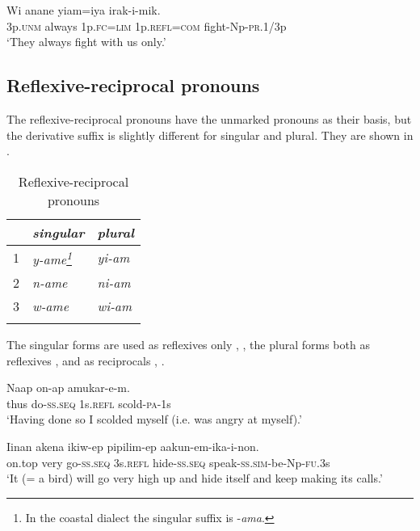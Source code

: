 \ea%
\label{ex:3:x609}
\gll Wi anane  yiam=iya irak-i-mik. \\
3p.\textsc{unm} always 1p.\textsc{fc}=\textsc{lim} 1p.\textsc{refl}=\textsc{com} fight-Np-\textsc{pr}.1/3p\\
\glt`They always fight with us only.'
\z

\subsection{Reflexive-reciprocal pronouns}\label{sec:3.5.8}
{}
The reflexive-reciprocal pronouns have the unmarked pronouns as their basis, but the derivative suffix is slightly different for singular and plural. They are shown in .

\begin{table}[b]
\caption{Reflexive-reciprocal pronouns}
\label{tab:3:refl-recpron}
 
\begin{tabular}{l>{\itshape}l>{\itshape}l}
\mytoprule
 &\upshape singular &\upshape plural\\
\midrule
1 &y-ame\footnote{In the coastal dialect the singular suffix is -\textit{ama}.} &yi-am\\
2 &n-ame &ni-am\\
3 &w-ame &wi-am\\
\mybottomrule
\end{tabular}
\end{table}


The singular forms are used as reflexives only , , the plural forms both as reflexives ,  and as reciprocals , .

\ea%
\label{ex:3:x610}
\gll Naap on-ap  amukar-e-m. \\
thus do-\textsc{ss}.\textsc{seq} 1s.\textsc{refl} scold-\textsc{pa}-1s\\
\glt`Having done so I scolded myself (i.e. was angry at myself).'
\z

\ea%
\label{ex:3:x1864}
\gll Iinan akena ikiw-ep  pipilim-ep aakun-em-ika-i-non.\\
on.top very go-\textsc{ss}.\textsc{seq} 3s.\textsc{refl} hide-\textsc{ss}.\textsc{seq} speak-\textsc{ss}.\textsc{sim}-be-Np-\textsc{fu}.3s\\
\glt`It (= a bird) will go very high up and hide itself and keep making its calls.'
\z

